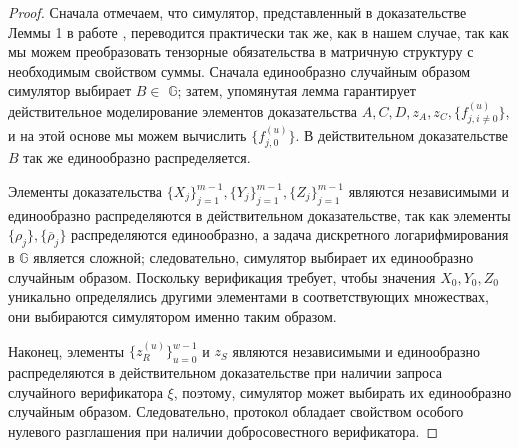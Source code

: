 \documentclass{article}
\theoremstyle{definition}
\begin{document}
\begin{proof}
Сначала отмечаем, что симулятор, представленный в доказательстве Леммы 1 в работе \cite{bootle}, переводится практически так же, как в нашем случае, так как мы можем преобразовать тензорные обязательства в матричную структуру с необходимым свойством суммы.
Сначала единообразно случайным образом симулятор выбирает $B \in$ \begin{math}\mathbb{G}\end{math}; затем, упомянутая лемма гарантирует действительное моделирование элементов доказательства $A,C,D,z_A,z_C,\{f^{(u)}_{j,i \neq 0}\}$, и на этой основе мы можем вычислить $\{f^{(u)}_{j,0}\}$.
В действительном доказательстве $B$ так же единообразно распределяется.

Элементы доказательства $\{X_j\}_{j=1}^{m-1},\{Y_j\}_{j=1}^{m-1}, \{Z_j\}_{j=1}^{m-1}$ являются независимыми и единообразно распределяются в действительном доказательстве, так как элементы $\{\rho_j\},\{\overline{\rho}_j\}$ распределяются единообразно, а задача дискретного логарифмирования в \begin{math}\mathbb{G}\end{math} является сложной; следовательно, симулятор выбирает их единообразно случайным образом.
Поскольку верификация требует, чтобы значения $X_0,Y_0,Z_0$ уникально определялись другими элементами в соответствующих множествах, они выбираются симулятором именно таким образом.

Наконец, элементы $\{z^{(u)}_R\}_{u=0}^{w-1}$ и $z_S$ являются независимыми и единообразно распределяются в действительном доказательстве при наличии запроса случайного верификатора $\xi$, поэтому, симулятор может выбирать их единообразно случайным образом.
Следовательно, протокол обладает свойством  особого нулевого разглашения при наличии добросовестного верификатора.


\end{proof}
\end{document}
